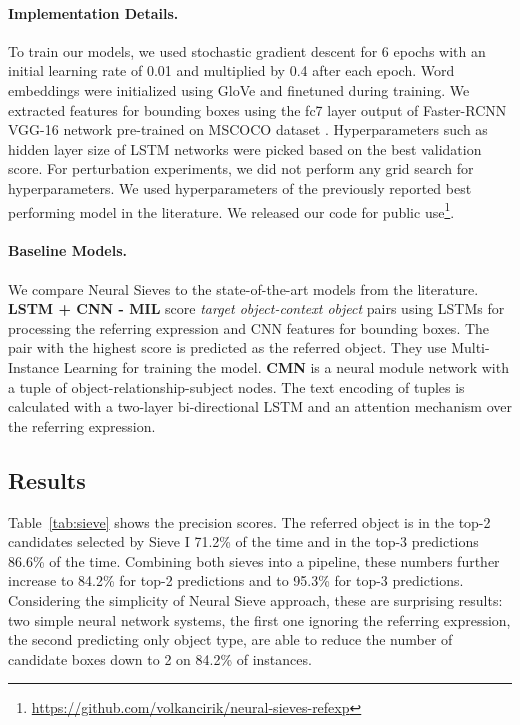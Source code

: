 \documentclass[11pt,a4paper]{article}
\begin{document}
\paragraph{Implementation Details.} 
To train our models, we used stochastic gradient descent for 6 epochs with an initial learning rate of 0.01 and multiplied by 0.4 after each epoch.
Word embeddings were initialized using GloVe \citep{pennington2014glove} and finetuned during training.
We extracted features for bounding boxes using the fc7 layer output of Faster-RCNN VGG-16 network \citep{ren2015faster} pre-trained on MSCOCO dataset \citep{lin2014microsoft}.
Hyperparameters such as hidden layer size of LSTM networks were picked based on the best validation score.
For perturbation experiments, we did not perform any grid search for hyperparameters. We used hyperparameters of the previously reported best performing model in the literature.
We released our code for public use\footnote{\href{https://github.com/volkancirik/neural-sieves-refexp}{https://github.com/volkancirik/neural-sieves-refexp}}.

\paragraph{Baseline Models.} We compare Neural Sieves to the state-of-the-art models from the literature.
\textbf{LSTM + CNN - MIL} \citet{nagaraja16refexp} score \textit{target object-context object} pairs using LSTMs for processing the referring expression and CNN features for bounding boxes. The pair with the highest score is predicted as the referred object.
They use Multi-Instance Learning for training the model.
\textbf{CMN} \citep{hu2017modeling} is a neural module network with a tuple of object-relationship-subject nodes.
The text encoding of tuples is calculated with a two-layer bi-directional LSTM and an attention mechanism \citep{bahdanau2014neural} over the referring expression.
\vspace{-5pt}
\subsection{Results}
\vspace{-5pt}
Table~\ref{tab:sieve} shows the precision scores.
The referred object is in the top-2 candidates selected by Sieve I 71.2\% of the time and in the top-3 predictions 86.6\% of the time. 
Combining both sieves into a pipeline,
these numbers further increase to 84.2\% for top-2 predictions and to 95.3\% for top-3 predictions.
Considering the simplicity of Neural Sieve approach, these are surprising results: two simple neural network systems, the first one ignoring the referring expression, the second predicting only object type, are able to reduce the number of candidate boxes down to 2 on 84.2\% of instances.
%
\vspace{-5pt}
\end{document}
